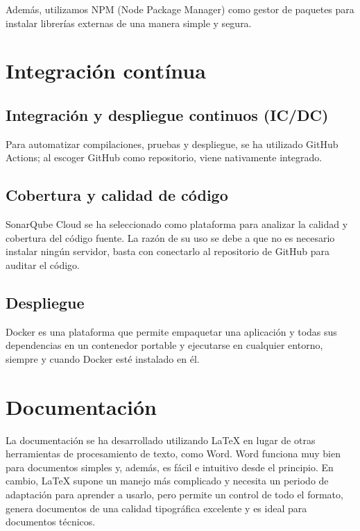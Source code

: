 Además, utilizamos NPM (Node Package Manager)\cite{npm:official} como gestor de paquetes para instalar librerías
externas de una manera simple y segura.

\section{Integración contínua}\label{sec:integracion}

\subsection{Integración y despliegue continuos (IC/DC)}\label{subsec:integracion_continua}

Para automatizar compilaciones, pruebas y despliegue, se ha utilizado GitHub Actions\cite{github:actions}; al
escoger GitHub como repositorio, viene nativamente integrado.

\subsection{Cobertura y calidad de código}\label{subsec:cobertura}

SonarQube Cloud\cite{sonarcloud:official} se ha seleccionado como plataforma para analizar la calidad y cobertura del código fuente.
La razón de su uso se debe a que no es necesario instalar ningún servidor, basta con conectarlo al repositorio de GitHub
para auditar el código.

\subsection{Despliegue}\label{subsec:despliegue}

Docker\cite{docker:official} es una plataforma que permite empaquetar una aplicación y todas sus dependencias en un
contenedor portable y ejecutarse en cualquier entorno, siempre y cuando Docker esté instalado en él.

\section{Documentación}\label{sec:documentacion}

La documentación se ha desarrollado utilizando LaTeX\cite{latex:official} en lugar de otras herramientas de procesamiento de texto, como Word.
Word funciona muy bien para documentos simples y, además, es fácil e intuitivo desde el principio.
En cambio, LaTeX supone un manejo más complicado y necesita un periodo de adaptación para aprender a usarlo, pero
permite un control de todo el formato, genera documentos de una calidad tipográfica
excelente y es ideal para documentos técnicos.


